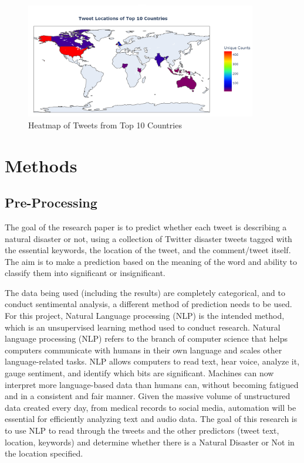\documentclass{article}
\begin{document}
\begin{figure}[!h]
    \centering
    \includegraphics[width= 0.9\textwidth, left]{map.png}
    \caption{Heatmap of Tweets from Top 10 Countries}
    \label{fig:map}
\end{figure}

\section{Methods}
\subsection{Pre-Processing}

The goal of the research paper is to predict whether each tweet is describing a natural disaster or not, using a collection of Twitter disaster tweets tagged with the essential keywords, the location of the tweet, and the comment/tweet itself. The aim is to make a prediction based on the meaning of the word and ability to classify them into significant or insignificant. 


The data being used (including the results) are completely categorical, and to conduct sentimental analysis, a different method of prediction needs to be used.  For this project, Natural Language processing (NLP) is the intended method, which is an unsupervised learning method used to conduct research. Natural language processing (NLP) refers to the branch of computer science that helps computers communicate with humans in their own language and scales other language-related tasks. NLP allows computers to read text, hear voice, analyze it, gauge sentiment, and identify which bits are significant. Machines can now interpret more language-based data than humans can, without becoming fatigued and in a consistent and fair manner. Given the massive volume of unstructured data created every day, from medical records to social media, automation will be essential for efficiently analyzing text and audio data. The goal of this research is to use NLP to read through the tweets and the other predictors (tweet text, location, keywords) and determine whether there is a Natural Disaster or Not in the location specified. 
\end{document}
